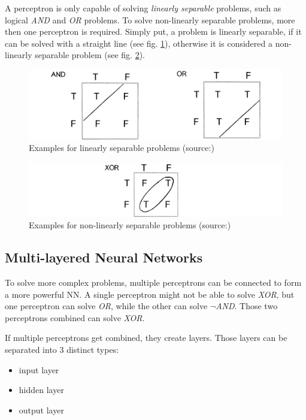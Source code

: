 A perceptron is only capable of solving \emph{linearly separable} problems, such as logical \emph{AND} and \emph{OR} problems. To solve non-linearly separable problems, more then one perceptron is required\cite{Rosenblatt58}. Simply put, a problem is linearly separable, if it can be solved with a straight line (see fig. \ref{fig2_linear}), otherwise it is considered a non-linearly separable problem (see fig. \ref{fig2_nonLinear}).

\begin{figure}[H]
	\begin{center}
		\includegraphics[scale=0.6]{img/lsp.png}
		\caption{Examples for linearly separable problems (source:\cite{Shiffman12})}
		\label{fig2_linear}
	\end{center}
\end{figure}

\begin{figure}[H]
	\begin{center}
		\includegraphics[scale=0.75]{img/nlsp.png}
		\caption{Examples for non-linearly separable problems (source:\cite{Shiffman12})}
		\label{fig2_nonLinear}
	\end{center}
\end{figure}


\subsection{Multi-layered Neural Networks}
To solve more complex problems, multiple perceptrons can be connected to form a more powerful NN. A single perceptron might not be able to solve \emph{XOR}, but one perceptron can solve \emph{OR}, while the other can solve \emph{$\neg$AND}. Those two perceptrons combined can solve \emph{XOR}\cite{Shiffman12}.

If multiple perceptrons get combined, they create layers. Those layers can be separated into 3 distinct types\cite{Stergiou96}:
\begin{itemize}
	\item input layer
	\item hidden layer
	\item output layer
\end{itemize}

